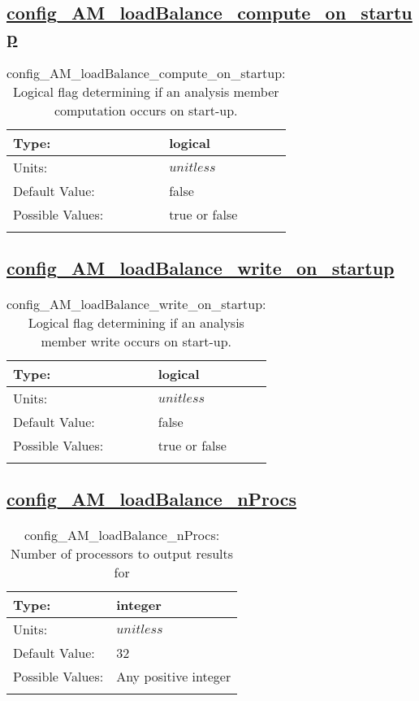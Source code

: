 \subsection[config\_AM\_loadBalance\_compute\_on\_startup]{\hyperref[sec:nm_tab_AM_loadBalance]{config\_AM\_loadBalance\_compute\_on\_startup}}
\label{subsec:nm_sec_config_AM_loadBalance_compute_on_startup}
\begin{center}
\begin{longtable}{| p{2.0in} || p{4.0in} |}
    \hline
    Type: & logical \\
    \hline
    Units: & $unitless$ \\
    \hline
    Default Value: & false \\
    \hline
    Possible Values: & true or false \\
    \hline
    \caption{config\_AM\_loadBalance\_compute\_on\_startup: Logical flag determining if an analysis member computation occurs on start-up.}
\end{longtable}
\end{center}
\subsection[config\_AM\_loadBalance\_write\_on\_startup]{\hyperref[sec:nm_tab_AM_loadBalance]{config\_AM\_loadBalance\_write\_on\_startup}}
\label{subsec:nm_sec_config_AM_loadBalance_write_on_startup}
\begin{center}
\begin{longtable}{| p{2.0in} || p{4.0in} |}
    \hline
    Type: & logical \\
    \hline
    Units: & $unitless$ \\
    \hline
    Default Value: & false \\
    \hline
    Possible Values: & true or false \\
    \hline
    \caption{config\_AM\_loadBalance\_write\_on\_startup: Logical flag determining if an analysis member write occurs on start-up.}
\end{longtable}
\end{center}
\subsection[config\_AM\_loadBalance\_nProcs]{\hyperref[sec:nm_tab_AM_loadBalance]{config\_AM\_loadBalance\_nProcs}}
\label{subsec:nm_sec_config_AM_loadBalance_nProcs}
\begin{center}
\begin{longtable}{| p{2.0in} || p{4.0in} |}
    \hline
    Type: & integer \\
    \hline
    Units: & $unitless$ \\
    \hline
    Default Value: & 32 \\
    \hline
    Possible Values: & Any positive integer \\
    \hline
    \caption{config\_AM\_loadBalance\_nProcs: Number of processors to output results for}
\end{longtable}
\end{center}
